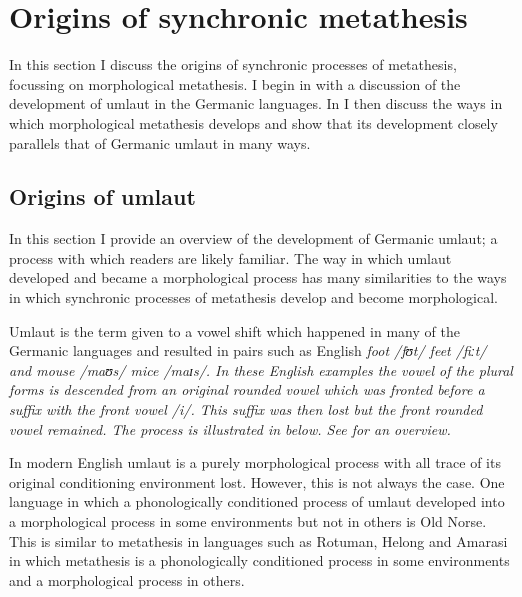 \section{Origins of synchronic metathesis}\label{sec:OriSynMet}
In this section I discuss the origins of synchronic
processes of metathesis, focussing on morphological metathesis.
I begin in  with a discussion of the development
of umlaut in the Germanic languages.
In  I then discuss the ways in which morphological metathesis
develops and show that its development closely parallels that of Germanic umlaut in many ways.

\subsection{Origins of umlaut}\label{sec:OriUml}
In this section I provide an overview of the development of Germanic umlaut;
a process with which readers are likely familiar.
The way in which umlaut developed and became a morphological
process has many similarities to the ways in which
synchronic processes of metathesis develop and become morphological.

Umlaut is the term given to a vowel shift which happened in
many of the Germanic languages and resulted in pairs such as
English \it{foot} /fʊt/ {\tl} \it{feet} /fiːt/
and \it{mouse} /maʊs/ {\tl} \it{mice} /maɪs/.
In these English examples the vowel of the plural forms
is descended from an original rounded vowel which was
fronted before a suffix with the front vowel /i/.
This suffix was then lost but the front rounded vowel remained.
The process is illustrated in  below.
See \citet[58ff]{ha07} for an overview.

\begin{exe}\let\eachwordone=\textnormal
	\label{ex:mu:s-2}
\end{exe}

In modern English umlaut is a purely morphological process
with all trace of its original conditioning environment lost.
However, this is not always the case.
One language in which a phonologically
conditioned process of umlaut developed into a morphological process
in some environments but not in others is Old Norse.
This is similar to metathesis in languages such as Rotuman, Helong
and Amarasi in which metathesis is a phonologically conditioned process
in some environments and a morphological process in others.

